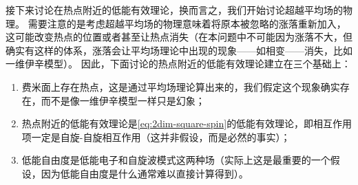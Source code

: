 \documentclass[hyperref, UTF8, a4paper]{ctexart}
\begin{document}
接下来讨论在热点附近的低能有效理论，换而言之，我们开始讨论超越平均场的物理。
需要注意的是考虑超越平均场的物理意味着将原本被忽略的涨落重新加入，这可能改变热点的位置或者甚至让热点消失（在本问题中不可能因为涨落不大，但确实有这样的体系，涨落会让平均场理论中出现的现象——如相变——消失，比如一维伊辛模型）。
因此，下面讨论的热点附近的低能有效理论建立在三个基础上：
\begin{enumerate}
    \item 费米面上存在热点，这是通过平均场理论算出来的，我们假定这个现象确实存在，而不是像一维伊辛模型一样只是幻象；
    \item 热点附近的低能有效理论是\eqref{eq:2dim-square-spin}的低能有效理论，即相互作用项一定是自旋-自旋相互作用（这并非假设，而是必然的事实）；
    \item 低能自由度是低能电子和自旋波模式这两种场（实际上这是最重要的一个假设，因为低能自由度是什么通常难以直接计算得到）。
\end{enumerate}
\end{document}

